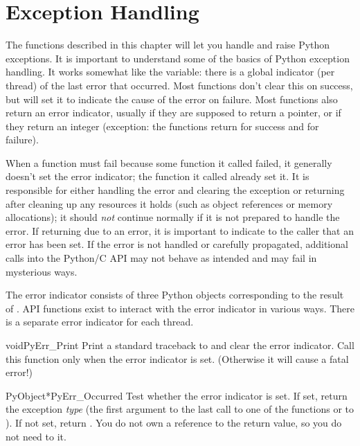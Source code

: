 \chapter{Exception Handling \label{exceptionHandling}}

The functions described in this chapter will let you handle and raise Python
exceptions.  It is important to understand some of the basics of
Python exception handling.  It works somewhat like the
\UNIX{}  variable: there is a global indicator (per
thread) of the last error that occurred.  Most functions don't clear
this on success, but will set it to indicate the cause of the error on
failure.  Most functions also return an error indicator, usually
\NULL{} if they are supposed to return a pointer, or  if they
return an integer (exception: the  functions
return  for success and  for failure).

When a function must fail because some function it called failed, it
generally doesn't set the error indicator; the function it called
already set it.  It is responsible for either handling the error and
clearing the exception or returning after cleaning up any resources it
holds (such as object references or memory allocations); it should
\emph{not} continue normally if it is not prepared to handle the
error.  If returning due to an error, it is important to indicate to
the caller that an error has been set.  If the error is not handled or
carefully propagated, additional calls into the Python/C API may not
behave as intended and may fail in mysterious ways.

The error indicator consists of three Python objects corresponding to
the result of .  API functions exist to interact
with the error indicator in various ways.  There is a separate
error indicator for each thread.


\begin{cfuncdesc}{void}{PyErr_Print}{}
  Print a standard traceback to  and clear the error
  indicator.  Call this function only when the error indicator is
  set.  (Otherwise it will cause a fatal error!)
\end{cfuncdesc}

\begin{cfuncdesc}{PyObject*}{PyErr_Occurred}{}
  Test whether the error indicator is set.  If set, return the
  exception \emph{type} (the first argument to the last call to one of
  the  functions or to
  ).  If not set, return \NULL.  You do
  not own a reference to the return value, so you do not need to
   it.  
\end{cfuncdesc}

